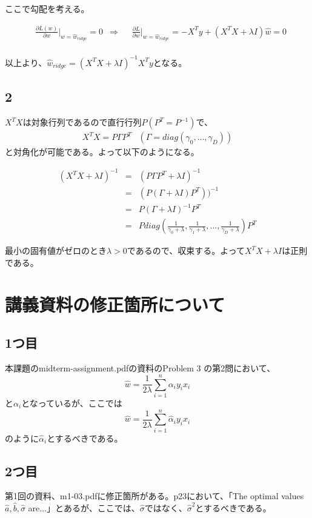 \documentclass[a4j,11pt]{jarticle}
\begin{document}
ここで勾配を考える。

\begin{equation}
    \begin{aligned}
        & \frac{\partial L(w)}{\partial w}|_{w=\hat{w}_{ridge}} = 0
        &\Rightarrow
        &&\frac{\partial L}{\partial w}|_{w=\hat{w}_{ridge}} = -X^Ty + (X^TX + \lambda I) \hat{w}= 0\\
    \end{aligned}
\end{equation}

以上より、$\hat{w}_{ridge} = (X^TX + \lambda I)^{-1}X^Ty$となる。

\subsection*{2}
$X^TX$は対象行列であるので直行行列$P(P^T = P^{-1})$で、
\begin{equation}
    \begin{aligned}
        X^TX = P\Gamma P^T 
        &(\Gamma = diag(\gamma_0,...,\gamma_D))
    \end{aligned}
\end{equation}
と対角化が可能である。よって以下のようになる。

\begin{eqnarray*}
    (X^TX + \lambda I)^{-1} &=& (P\Gamma P^T + \lambda I)^{-1}\\
    &=& \left( P(\Gamma + \lambda I)P^T \right))^{-1}\\
    &=& P(\Gamma + \lambda I )^{-1}P^T\\
    &=& Pdiag(\frac{1}{\gamma_0 + \lambda},\frac{1}{\gamma_1 + \lambda},...,\frac{1}{\gamma_D + \lambda})P^T
\end{eqnarray*}

最小の固有値がゼロのとき$\lambda > 0$であるので、収束する。よって$X^TX + \lambda I$は正則である。


\section*{講義資料の修正箇所について}
\subsection*{1つ目}
本課題のmidterm-assignment.pdfの資料のProblem 3 の第2問において、
\begin{equation*}
    \hat{w} = \frac{1}{2\lambda} \sum_{i=1}^n \alpha_i y_i x_i
\end{equation*}
と$\alpha_i$となっているが、ここでは
\begin{equation*}
    \hat{w} = \frac{1}{2\lambda} \sum_{i=1}^n \hat{\alpha}_i y_i x_i
\end{equation*}
のように$\hat{\alpha}_i$とするべきである。

\subsection*{2つ目}
第1回の資料、m1-03.pdfに修正箇所がある。p23において、「The optimal values $\hat{a},\hat{b},\hat{\sigma}$ are...」とあるが、ここでは、$\hat{\sigma}$ではなく、$\hat{\sigma}^2$とするべきである。
\end{document}
